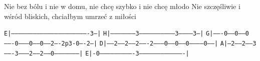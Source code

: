 \documentclass[../../../songbook.tex]{subfiles}
\begin{document}
Nie bez bólu i nie w domu, nie chcę szybko i nie chcę młodo				 \newline
Nie szczęśliwie i wśród bliskich, chciałbym umrzeć z miłości				 \newline

 \texttt{E|----------------------------------------------------------------3---|}	\newline
 \texttt{H|---------------------3------------------------------3-----------3---|}	\newline
 \texttt{G|-------0-----0-----0-------0--------0------0------2----2p3-0----2---|}	\newline
 \texttt{D|-----2-----2-----2-------2--------0------0------0------------0------|}	\newline
 \texttt{A|---2-----2-----3-------3--------2------2------0---------------------|}	\newline
 \texttt{E|-0----------------------------3-------------------------------------|}
 
\end{document}
